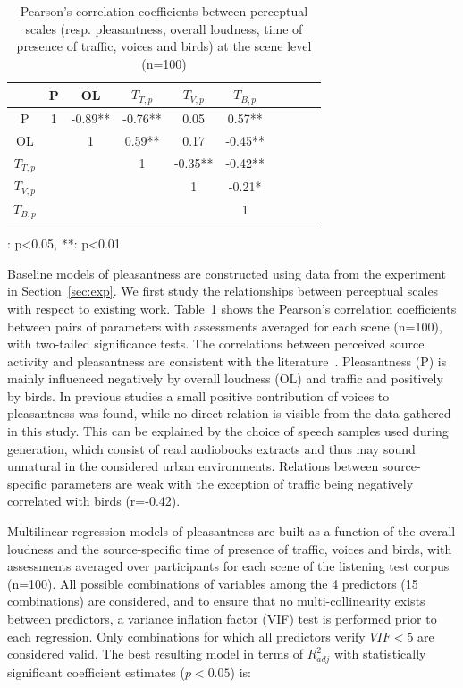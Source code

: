 \documentclass[twocolumn]{article}
\begin{document}
\begin{table}[t]
\centering
\begin{threeparttable}
\caption{Pearson's correlation coefficients between perceptual scales (resp. pleasantness, overall loudness, time of presence of traffic, voices and birds) at the scene level (n=100)}
\label{tab:percc}
\begin{tabular}{ c | c c c c c c c c c }
\hline
	 & P & OL & $T_{T, p}$ & $T_{V, p}$ & $T_{B, p}$ \\ \hline
	P & 1 & -0.89** & -0.76** & 0.05 & 0.57** \\
	OL &  & 1 & 0.59** & 0.17 & -0.45** \\
	$T_{T, p}$ &  &  & 1 & -0.35** & -0.42** \\
	$T_{V, p}$ &  &  &  & 1 & -0.21* \\
	$T_{B, p}$ &  &  &  &  & 1 \\ \hline
\end{tabular}
\begin{tablenotes}
\item *: p<0.05, **: p<0.01
\end{tablenotes}
\end{threeparttable}
\end{table}

Baseline models of pleasantness are constructed using data from the experiment in Section~\ref{sec:exp}. We first study the relationships between perceptual scales with respect to existing work. Table~\ref{tab:percc} shows the Pearson's correlation coefficients between pairs of parameters with assessments averaged for each scene (n=100), with two-tailed significance tests. The correlations between perceived source activity and pleasantness are consistent with the literature~\cite{aumond2017, gontier2018}. Pleasantness (P) is mainly influenced negatively by overall loudness (OL) and traffic and positively by birds. In previous studies a small positive contribution of voices to pleasantness was found, while no direct relation is visible from the data gathered in this study. This can be explained by the choice of speech samples used during generation, which consist of read audiobooks extracts and thus may sound unnatural in the considered urban environments. Relations between source-specific parameters are weak with the exception of traffic being negatively correlated with birds (r=-0.42).

Multilinear regression models of pleasantness are built as a function of the overall loudness and the source-specific time of presence of traffic, voices and birds, with assessments averaged over participants for each scene of the listening test corpus (n=100). All possible combinations of variables among the 4 predictors (15 combinations) are considered, and to ensure that no multi-collinearity exists between predictors, a variance inflation factor (VIF) test is performed prior to each regression. Only combinations for which all predictors verify $VIF<5$ are considered valid. The best resulting model in terms of $R^2_{adj}$ with statistically significant coefficient estimates ($p<0.05$) is:
\end{document}
